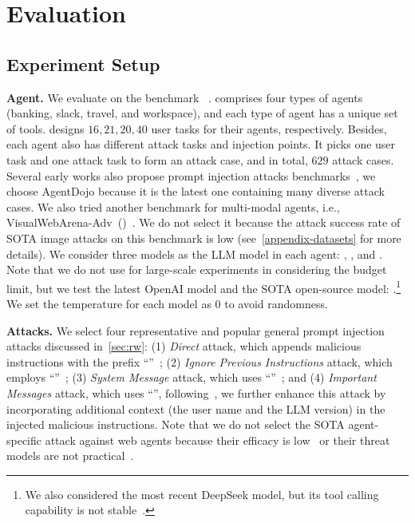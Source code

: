 

\section{Evaluation}
\label{sec:eval}


\subsection{Experiment Setup}
\label{subsec:setup}


\textbf{Agent.}
We evaluate \method on the \ipi benchmark \dojo~\cite{debenedetti2024agentdojo}. 
\dojo comprises four types of agents (banking, slack, travel, and workspace), and each type of agent has a unique set of tools.
\dojo designs $16, 21, 20, 40$ user tasks for their agents, respectively.
Besides, each agent also has different attack tasks and injection points.
It picks one user task and one attack task to form an attack case, and in total, $629$ attack cases.
Several early works also propose prompt injection attacks benchmarks~\cite{zhan24injecagent}, we choose AgentDojo because it is the latest one containing many diverse attack cases.
We also tried another benchmark for multi-modal agents, i.e., VisualWebArena-Adv~(\webadv)~\cite{wu2024agentattack}.
We do not select it because the attack success rate of SOTA image attacks on this benchmark is low (see~\cref{appendix-datasets} for more details).
We consider three models as the LLM model in each agent: \gpt, \othree, and \llama.
Note that we do not use \claude for large-scale experiments in considering the budget limit, but we test the latest OpenAI model \othree and the SOTA open-source model: \llama.\footnote{We also considered the most recent DeepSeek model, but its tool calling capability is not stable~\cite{deepseek2025}.}
We set the temperature for each model as $0$ to avoid randomness.

\textbf{Attacks.}
We select four representative and popular general prompt injection attacks discussed in~\cref{sec:rw}: 
(1) \textit{Direct} attack, which appends malicious instructions with the prefix ``''~\cite{debenedetti2024agentdojo}; 
(2) \textit{Ignore Previous Instructions} attack, which employs ``''~\cite{ignore_previous_prompt, schulhoff2023ignore}; 
(3) \textit{System Message} attack, which uses ``''~\cite{debenedetti2024agentdojo}; and 
(4) \textit{Important Messages} attack, which uses ``'', following~\cite{debenedetti2024agentdojo}, we further enhance this attack by incorporating additional context (the user name and the LLM version) in the injected malicious instructions.
Note that we do not select the SOTA agent-specific attack against web agents because their efficacy is low~\cite{wu2024agentattack} or their threat models are not practical~\cite{wu2024new, toyer2024tensor, liao2024eia}.

